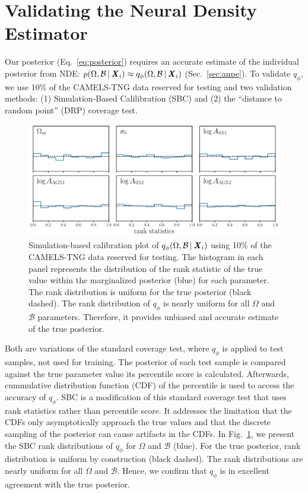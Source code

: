 \section{Validating the Neural Density Estimator} \label{sec:valid}
Our posterior (Eq.~\ref{eq:posterior}) requires an accurate estimate of the
individual posterior from NDE: 
$p(\Omega, \mathcal{B}\,|\, {\textbf{\textit{X}}_i}) \approx q_\phi(\Omega, \mathcal{B}\,|\, {\textbf{\textit{X}}_i})$
(Sec.~\ref{sec:anpe}). 
To validate $q_\phi$, we use 10\% of the CAMELS-TNG data reserved for testing
and two validation methods: (1) Simulation-Based Calilibration (SBC) and (2)
the ``distance to random point'' (DRP) coverage test. 

\begin{figure}[ht]
\vskip 0.2in
\begin{center}
    \centerline{\includegraphics[width=0.9\columnwidth]{figs/ranks_p_omega_x.pdf}}
    \caption{
        Simulation-based calibration plot of 
        $q_\phi(\Omega, \mathcal{B}\,|\, {\textbf{\textit{X}}_i})$ using 10\% of the
        CAMELS-TNG data reserved for testing.
        The histogram in each panel represents the distribution of the rank
        statistic of the true value within the marginalized posterior (blue)
        for each parameter. 
        The rank distribution is uniform for the true posterior (black dashed).
        The rank distribution of $q_\phi$ is nearly uniform for all $\Omega$
        and $\mathcal{B}$ 
        parameters. 
        Therefore, it provides unbiased and accurate estimate of the true
        posterior.
    }\label{fig:ranks}
\end{center}
\vskip -0.2in
\end{figure}

Both are variations of the standard coverage test, where $q_\phi$ is applied to
test samples, not used for training. 
The posterior of each test sample is compared against the true parameter value
its percentile score is calculated.
Afterwards, cummulative distribution function (CDF) of the percentile is used
to access the accuracy of $q_\phi$.
SBC is a modification of this standard coverage test that uses rank statistics
rather than percentile score. 
It addresses the limitation that the CDFs only asymptotically approach the true
values and that the discrete sampling of the posterior can cause artifacts in
the CDFs. 
In Fig.~\ref{fig:ranks}, we present the SBC rank distributions of $q_\phi$ for
$\Omega$ and $\mathcal{B}$ (blue). 
For the true posterior, rank distribution is uniform by construction (black
dashed).
The rank distributions are nearly uniform for all $\Omega$ and
$\mathcal{B}$.
Hence, we confirm that $q_\phi$ is in excellent agreement with the true
posterior.


